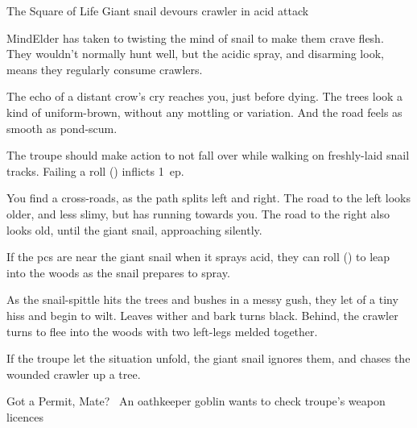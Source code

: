 
{The Square of Life}%
{Giant snail devours \gls{crawler} in acid attack}%

\begin{exampletext}
  \Gls{MindElder} has taken to twisting the mind of snail to make them crave flesh.
  They wouldn't normally hunt well, but the acidic spray, and disarming look, means they regularly consume \glspl{crawler}.
\end{exampletext}

\begin{boxtext}
  The echo of a distant crow's cry reaches you, just before dying.
  The trees look a kind of uniform-brown, without any mottling or variation.
  And the road feels as smooth as pond-scum.
\end{boxtext}

The troupe should make  action to not fall over while walking on freshly-laid snail tracks.
Failing a  roll (\tn[7]) inflicts 1~\gls{ep}.

\begin{boxtext}
  You find a cross-roads, as the path splits left and right.
  The road to the left looks older, and less slimy, but has  running towards you.
  The road to the right also looks old, until the giant snail, approaching silently.
\end{boxtext}

If the \glspl{pc} are near the giant snail when it sprays acid, they can roll  (\tn[7]) to leap into the woods as the snail prepares to spray.

\begin{boxtext}
  As the snail-spittle hits the trees and bushes in a messy gush, they let of a tiny hiss and begin to wilt.
  Leaves wither and bark turns black.
  Behind, the \gls{crawler} turns to flee into the woods with two left-legs melded together.
\end{boxtext}

If the troupe let the situation unfold, the giant snail ignores them, and chases the wounded \gls{crawler} up a tree.

{Got a Permit, Mate?}%
{~An oathkeeper goblin wants to check troupe's weapon licences}%


